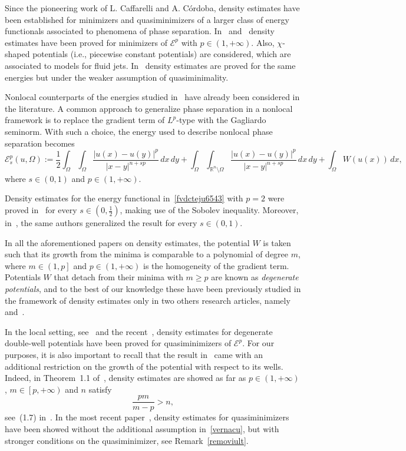 \documentclass[12pt]{article}
\newcommand{\R}{\mathbb{R}}
\numberwithin{equation}{section}
\renewcommand{\geq}{\geqslant}
\begin{document}
Since the pioneering work of L. Caffarelli and A. C\'ordoba, density estimates have been established for minimizers and quasiminimizers of a larger class of energy functionals associated to phenomena of phase separation. In~\cite{MR2126143} and~\cite{6} density estimates have been proved for minimizers of $\mathcal{E}^p$ with $p\in (1,+\infty)$. Also, $\chi$-shaped potentials (i.e., piecewise constant potentials) are considered, which are associated to models for fluid jets. In~\cite{MR2413100} density estimates are proved for the same energies but under the weaker assumption of quasiminimality.  

Nonlocal counterparts of the energies studied in~\cite{MR1310848,MR2126143,6,MR2413100} have already been considered in the literature. A common approach to generalize phase separation in a nonlocal framework is to replace the gradient term of $L^p$-type with the Gagliardo seminorm. With such a choice, the energy used to describe nonlocal phase separation becomes 
\begin{equation}\label{fvdcteju6543}
\mathcal{E}_s^p(u,\Omega):=\frac{1}{2}\int_{\Omega}\int_{\Omega}\frac{\left|u(x)-u(y)\right|^p}{\left|x-y\right|^{n+sp}}\,dx\,dy+\int_{\Omega}\int_{\R^n\setminus \Omega}\frac{\left|u(x)-u(y)\right|^p}{\left|x-y\right|^{n+sp}}\,dx\,dy+\int_{\Omega}W(u(x))\,dx,
\end{equation} 
where $s\in (0,1)$ and $p\in (1,+\infty)$. 

Density estimates for the energy functional in~\eqref{fvdcteju6543} with $p=2$ were proved in~\cite{MR2873236} for every $s\in \left(0,\frac{1}{2}\right)$, making use of the Sobolev inequality. Moreover, in~\cite{MR3133422}, the same authors generalized the result for every $s\in (0,1)$.      

In all the aforementioned papers on density estimates, the potential $W$ is taken such that its growth from the minima is comparable to a polynomial of degree $m$, where $m\in \left(1,p\right]$ and $p\in (1,+\infty)$ is the homogeneity of the gradient term. Potentials $W$ that detach from their minima with $m\geq p$ are known as \textit{degenerate potentials}, and to the best of our knowledge these have been previously studied in the framework of density estimates only in two others  research articles, namely~\cite{1} and~\cite{DFVERPP}.     

In the local setting, see~\cite{1} and the recent~\cite{savin2025density}, density estimates for degenerate double-well potentials have been proved for quasiminimizers of $\mathcal{E}^p$. For our purposes, it is also important to recall that the result in~\cite{1} came with an additional restriction
on the growth of the potential with respect to its wells. Indeed, in Theorem~1.1 of~\cite{1}, density estimates are showed as far as $p\in (1,+\infty)$, $m\in \left[p,+\infty\right)$ and $n$ satisfy 
\begin{equation}\label{vernacu}
\frac{pm}{m-p}>n,  
\end{equation}
see~(1.7) in~\cite{1}. In the most recent paper~\cite{savin2025density}, density estimates for quasiminimizers have been showed without the additional assumption in~\eqref{vernacu}, but with stronger conditions on the quasiminimizer, see Remark~\ref{removiult}.
\end{document}
